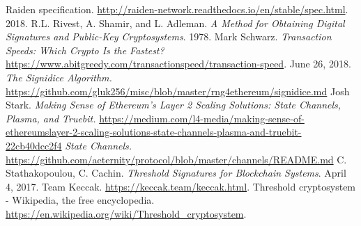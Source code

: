 \documentclass[tikz, 12pt]{article}
\theoremstyle{definition}
\theoremstyle{remark}
\begin{document}
\begin{thebibliography}{9}
 Raiden specification. \url{http://raiden-network.readthedocs.io/en/stable/spec.html}. 2018.
 R.L. Rivest, A. Shamir, and L. Adleman. \emph{A Method for Obtaining Digital Signatures and Public-Key Cryptosystems}. 1978.
 Mark Schwarz. \emph{Transaction Speeds: Which Crypto Is the Fastest?} \url{https://www.abitgreedy.com/transactionspeed/transaction-speed}. June 26, 2018.
 \emph{The Signidice Algorithm.} \url{https://github.com/gluk256/misc/blob/master/rng4ethereum/signidice.md}
 Josh Stark. \emph{Making Sense of Ethereum’s Layer 2 Scaling Solutions: State Channels, Plasma, and Truebit.} \url{https://medium.com/l4-media/making-sense-of-ethereumslayer-2-scaling-solutions-state-channels-plasma-and-truebit-22cb40dcc2f4}
 \emph{State Channels.} \url{https://github.com/aeternity/protocol/blob/master/channels/README.md}
 C. Stathakopoulou, C. Cachin. \emph{Threshold Signatures for Blockchain Systems}. April 4, 2017. 
 Team Keccak. \url{https://keccak.team/keccak.html}.
 Threshold cryptosystem - Wikipedia, the free encyclopedia. \url{https://en.wikipedia.org/wiki/Threshold_cryptosystem}.
\end{thebibliography}


		
\end{document}
